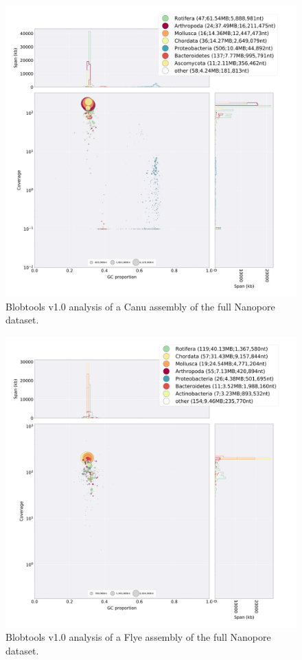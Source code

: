 \begin{suppsection}
   \begin{figure}[ht]
    \centering
     \includegraphics[width=15cm]{fig/benchmark/ONT_CANU.png}
   \caption{Blobtools v1.0 analysis of a Canu assembly of the full Nanopore dataset.}
   \label{fig:blobtools_canu_ont}
 \end{figure}
 
   \begin{figure}[ht]
    \centering
     \includegraphics[width=15cm]{fig/benchmark/ONT_FLYE.png}
   \caption{Blobtools v1.0 analysis of a Flye assembly of the full Nanopore dataset.}
   \label{fig:blobtools_flye_ont}
 \end{figure}


\end{suppsection}
